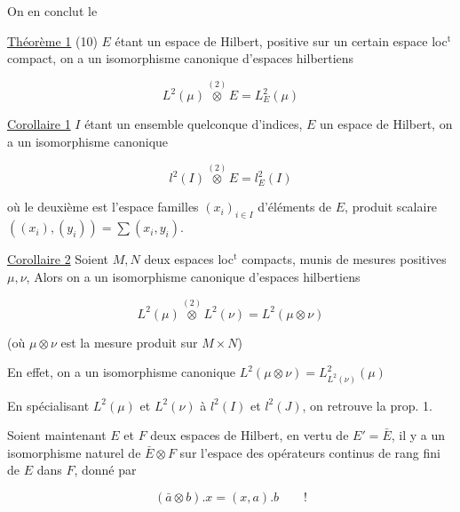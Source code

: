 On en conclut le

\uline{Théorème 1} (10) $E$ étant un espace de Hilbert,   positive sur un certain espace loc$^{\mathrm{t}}$ compact,
on a un isomorphisme canonique d'espaces hilbertiens

\[
L^2(\mu)\overset{(2)}{\otimes}E=L^2_E(\mu) \tag*{(11)}
\]

\uline{Corollaire 1} $I$ étant un ensemble quelconque d'indices, $E$
un  espace de Hilbert, on a un isomorphisme
canonique

\[
l^2(I)\overset{(2)}{\otimes}E=l^2_E(I) \tag*{(12)}
\]

où le deuxième  est l'espace  
 familles  $(x_i)_{i\in I}$ d'éléments de $E$,  
  produit scalaire $((x_i),(y_i))=\sum(x_i,y_i)$.

\uline{Corollaire 2} Soient $M,N$ deux espaces loc$^{\mathrm{t}}$ compacts,
munis de mesures positives $\mu,\nu$, Alors  on
a un isomorphisme canonique d'espaces hilbertiens

\[
L^2(\mu)\overset{(2)}{\otimes}L^2(\nu)=L^2(\mu\otimes\nu) \tag*{(13)}
\]

(où $\mu\otimes\nu$ est la mesure produit  sur $M\times N$)

En effet, on a un isomorphisme canonique $L^2(\mu\otimes\nu)=L^2_{L^2(\nu)}(\mu)$

En spécialisant $L^2(\mu)$ et $L^2(\nu)$ à $l^2(I)$ et $l^2(J)$, on
 retrouve la prop. 1.

Soient maintenant $E$ et $F$ deux espaces de Hilbert,
en vertu de $E'=\bar E$,  il y a un
isomorphisme naturel de $\bar E\otimes F$ sur l'espace des
opérateurs  continus de rang fini de
$E$ dans $F$, donné par

\[
(\bar a\otimes b).x=(x,a).b\qquad! \tag*{(14)}
\]

